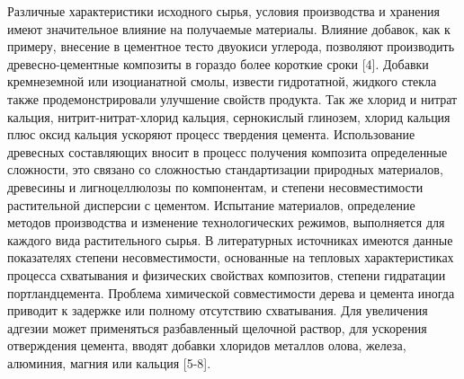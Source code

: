 \begin{multicols}{2}
Различные характеристики исходного сырья, условия производства и
хранения имеют значительное влияние на получаемые материалы. Влияние
добавок, как к примеру, внесение в цементное тесто двуокиси углерода,
позволяют производить древесно-цементные композиты в гораздо более
короткие сроки {[}4{]}. Добавки кремнеземной или изоцианатной смолы,
извести гидротатной, жидкого стекла также продемонстрировали улучшение
свойств продукта. Так же хлорид и нитрат кальция, нитрит-нитрат-хлорид
кальция, сернокислый глинозем, хлорид кальция плюс оксид кальция
ускоряют процесс твердения цемента. Использование древесных составляющих
вносит в процесс получения композита определенные сложности, это связано
со сложностью стандартизации природных материалов, древесины и
лигноцеллюлозы по компонентам, и степени несовместимости растительной
дисперсии с цементом. Испытание материалов, определение методов
производства и изменение технологических режимов, выполняется для
каждого вида растительного сырья. В литературных источниках имеются
данные показателях степени несовместимости, основанные на тепловых
характеристиках процесса схватывания и физических свойствах композитов,
степени гидратации портландцемента. Проблема химической совместимости
дерева и цемента иногда приводит к задержке или полному отсутствию
схватывания. Для увеличения адгезии может применяться разбавленный
щелочной раствор, для ускорения отверждения цемента, вводят добавки
хлоридов металлов олова, железа, алюминия, магния или кальция {[}5-8{]}.


\end{multicols}
